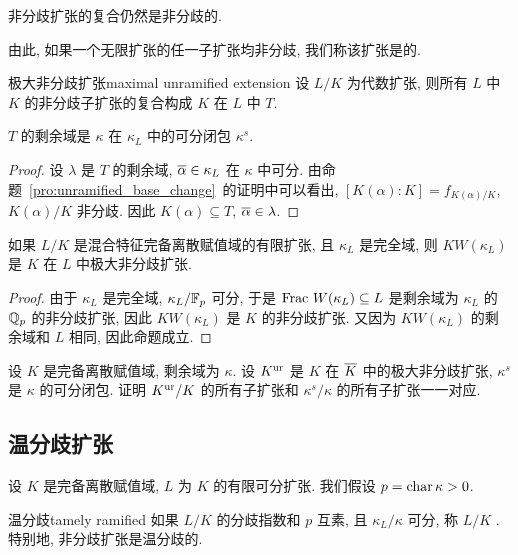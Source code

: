 \begin{corollary}{}{}
非分歧扩张的复合仍然是非分歧的.
\end{corollary}
由此, 如果一个无限扩张的任一子扩张均非分歧, 我们称该扩张是的.

\begin{definition}{极大非分歧扩张}{maximal unramified extension}
设 $L/K$ 为代数扩张, 则所有 $L$ 中 $K$ 的非分歧子扩张的复合构成 $K$ 在 $L$ 中 $T$.
\end{definition}

\begin{proposition}{}{}
$T$ 的剩余域是 $\kappa$ 在 $\kappa_L$ 中的可分闭包 $\kappa^s$.
\end{proposition}
\begin{proof}
设 $\lambda$ 是 $T$ 的剩余域, $\overline\alpha\in\kappa_L$ 在 $\kappa$ 中可分.
由命题~\ref{pro:unramified_base_change}~的证明中可以看出, $[K(\alpha):K]=f_{K(\alpha)/K}$, $K(\alpha)/K$ 非分歧. 因此 $K(\alpha)\subseteq T$, $\overline\alpha\in\lambda$.
\end{proof}

\begin{proposition}{}{}
如果 $L/K$ 是混合特征完备离散赋值域的有限扩张, 且 $\kappa_L$ 是完全域, 则 $K W(\kappa_L)$ 是 $K$ 在 $L$ 中极大非分歧扩张.
\end{proposition}
\begin{proof}
由于 $\kappa_L$ 是完全域, $\kappa_L/{\mathbb{F}}_p$ 可分, 于是 ${\mathrm{Frac}\,}\,W(\kappa_L)\subseteq L$ 是剩余域为 $\kappa_L$ 的 ${\mathbb{Q}}_p$ 的非分歧扩张, 因此 $K W(\kappa_L)$ 是 $K$ 的非分歧扩张. 又因为 $K W(\kappa_L)$ 的剩余域和 $L$ 相同, 因此命题成立.
\end{proof}

\begin{exercise}
设 $K$ 是完备离散赋值域, 剩余域为 $\kappa$. 设 $K^{\mathrm{ur}}$ 是 $K$ 在 $\overline K$ 中的极大非分歧扩张, $\kappa^s$ 是 $\kappa$ 的可分闭包. 证明 $K^{\mathrm{ur}}/K$ 的所有子扩张和 $\kappa^s/\kappa$ 的所有子扩张一一对应.
\end{exercise}


\subsection{温分歧扩张}
设 $K$ 是完备离散赋值域, $L$ 为 $K$ 的有限可分扩张. 我们假设 $p={\mathrm{char}}\,\kappa>0$.

\begin{definition}{温分歧}{tamely ramified}
如果 $L/K$ 的分歧指数和 $p$ 互素, 且 $\kappa_L/\kappa$ 可分, 称 $L/K$ . 特别地, 非分歧扩张是温分歧的.
\end{definition}

